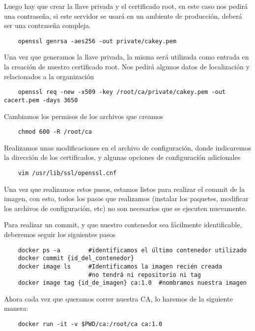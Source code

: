 \noindent Luego hay que crear la llave privada y el certificado root, en este caso nos pedirá una contraseña, si este servidor 
se usará en un ambiente de producción, deberá ser una contraseña compleja.

\begin{verbatim}
    openssl genrsa -aes256 -out private/cakey.pem

\end{verbatim}

\noindent Una vez que generamos la llave privada, la misma será utilizada como entrada en la creación de 
nuestro certificado root. Nos pedirá algunos datos de localización y relacionados a la 
organización

\begin{verbatim}
    openssl req -new -x509 -key /root/ca/private/cakey.pem -out cacert.pem -days 3650
\end{verbatim}

\noindent Cambiamos los permisos de los archivos que creamos
\begin{verbatim}
    chmod 600 -R /root/ca
\end{verbatim}

\noindent Realizamos unas modificaciones en el archivo de configuración, donde indicaremos 
la dirección de los certificados, y algunas opciones de configuración adicionales
\begin{verbatim}
    vim /usr/lib/ssl/openssl.cnf
\end{verbatim}

Una vez que realizamos estos pasos, estamos listos para realizar el commit de la imagen, con esto,
todos los pasos que realizamos (instalar los paquetes, modificar los archivos de configuración, etc)
no son necesarios que se ejecuten nuevamente.

Para realizar un commit, y que nuestro contenedor sea fácilmente identificable, deberemos seguir 
los siguientes pasos

\begin{verbatim}
    docker ps -a        #identificamos el último contenedor utilizado
    docker commit {id_del_contenedor} 
    docker image ls     #Identificamos la imagen recién creada
                        #no tendrá ni repositorio ni tag
    docker image tag {id_de_imagen} ca:1.0  #nombramos nuestra imagen
\end{verbatim}




Ahora cada vez que queramos correr nuestra CA, lo haremos de la siguiente manera:
\begin{verbatim}
    docker run -it -v $PWD/ca:/root/ca ca:1.0
\end{verbatim}

